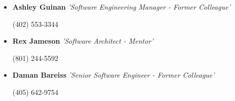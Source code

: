 \documentclass[11pt,a4paper,sans]{moderncv}        %
\begin{document}
\vspace{5pt}
 
\begin{itemize}

\item{\textbf{Ashley Guinan}  \textit{'Software Engineering Manager - Former Colleague'}\begin{flushright}\small{{(402) 553-3344}}\end{flushright}}

\item{\textbf{Rex Jameson} \textit{'Software Architect - Mentor'}\begin{flushright}\small{{(801) 244-5592}}\end{flushright}}

\item{\textbf{Daman Bareiss} \textit{'Senior Software Engineer - Former Colleague'}\begin{flushright}\small{{(405) 642-9754}}\end{flushright}}
\end{itemize}

\nocite{*}



\end{document}
